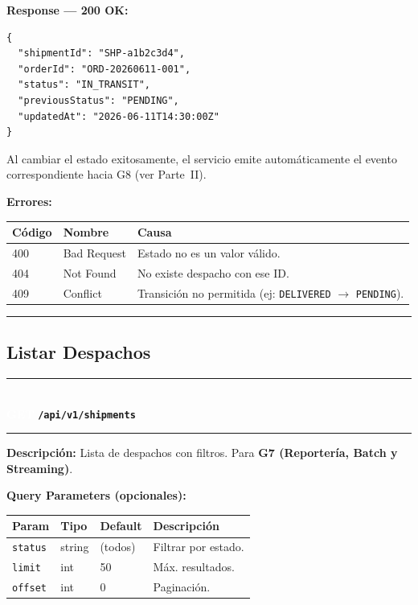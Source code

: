 \documentclass[11pt, a4paper]{article}
\newcommand{\httpmethod}[2]{%
  \colorbox{#1}{\textcolor{white}{\textbf{\small\textsf{#2}}}}%
}
\newcommand{\routeheader}[3]{%
  \noindent\rule{\textwidth}{1.5pt}\\[0.3em]
  \httpmethod{#1}{#2}\;\texttt{\bfseries #3}\\[0.3em]
  \rule{\textwidth}{0.4pt}
  \vspace{0.3cm}
}
\begin{document}
\textbf{Response --- 200 OK:}

\begin{lstlisting}
{
  "shipmentId": "SHP-a1b2c3d4",
  "orderId": "ORD-20260611-001",
  "status": "IN_TRANSIT",
  "previousStatus": "PENDING",
  "updatedAt": "2026-06-11T14:30:00Z"
}
\end{lstlisting}

\begin{infobox}
  Al cambiar el estado exitosamente, el servicio emite automáticamente
  el evento correspondiente hacia G8 (ver Parte~II).
\end{infobox}

\textbf{Errores:}
\begin{table}[ht!]
\small
\begin{tabularx}{\textwidth}{l l X}
  \toprule
  \textbf{Código} & \textbf{Nombre} & \textbf{Causa} \\
  \midrule
  400 & Bad Request & Estado no es un valor válido. \\
  404 & Not Found   & No existe despacho con ese ID. \\
  409 & Conflict    & Transición no permitida (ej: \texttt{DELIVERED} $\rightarrow$ \texttt{PENDING}). \\
  \bottomrule
\end{tabularx}
\end{table}

\noindent\rule{\textwidth}{0.4pt}

\subsection{Listar Despachos}

\routeheader{get}{GET}{/api/v1/shipments}

\textbf{Descripción:} Lista de despachos con filtros. Para \textbf{G7 (Reportería, Batch y Streaming)}.

\vspace{0.3cm}
\textbf{Query Parameters (opcionales):}
\begin{table}[ht!]
\small
\begin{tabularx}{\textwidth}{l l l X}
  \toprule
  \textbf{Param} & \textbf{Tipo} & \textbf{Default} & \textbf{Descripción} \\
  \midrule
  \texttt{status} & string & (todos) & Filtrar por estado. \\
  \texttt{limit}  & int    & 50      & Máx. resultados. \\
  \texttt{offset} & int    & 0       & Paginación. \\
  \bottomrule
\end{tabularx}
\end{table}
\end{document}
